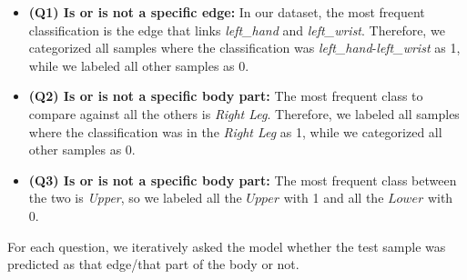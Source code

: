 \begin{itemize}

    \item \textbf{(Q1) Is or is not a specific edge:} In our dataset, the most frequent classification is the edge that links \textit{left\_hand} and \textit{left\_wrist}. 
    Therefore, we categorized all samples where the classification was \textit{left\_hand}-\textit{left\_wrist} as 1, while we labeled all other samples as 0.   
    
    \item \textbf{(Q2) Is or is not a specific body part:} The most frequent class to compare against all the others is \textit{Right Leg}.
    Therefore, we labeled all samples where the classification was in the \textit{Right Leg} as 1, while we categorized all other samples as 0.

    \item \textbf{(Q3) Is or is not a specific body part:} The most frequent class between the two is \textit{Upper}, so we labeled all the $Upper$ with 1 and all the $Lower$ with 0.
    
   
\end{itemize}

For each question, we iteratively asked the model whether the test sample was predicted as that edge/that part of the body or not.

